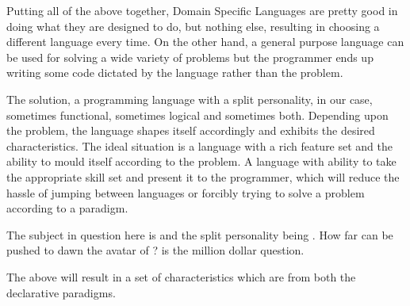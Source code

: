 \documentclass[thesis-solanki.tex]{subfiles}
\begin{document}
Putting all of the above together, Domain Specific Languages
are pretty good in doing what they are designed to do,
but nothing else, resulting in choosing a different language every time.
On the other hand, a general purpose language can be used for solving a wide variety of problems but  the programmer ends up writing some code dictated by the language rather than the
problem.

The solution, a programming language with a split personality, in our case, sometimes functional, sometimes logical and sometimes
both.
Depending upon the problem, the language shapes itself accordingly and exhibits the desired characteristics. The ideal situation is a
language with a rich
feature set and the ability to mould itself according to the problem. A language with ability to take the appropriate skill set and present
it to the
programmer, which will reduce the hassle of jumping between languages or forcibly trying to solve a problem according to a paradigm.

The subject in question here is  and the split personality being . How far can  be pushed to
dawn the avatar of \xxx{ }?
 is the million dollar question.

The above will result in a set of characteristics which are from both the declarative paradigms.
\end{document}

